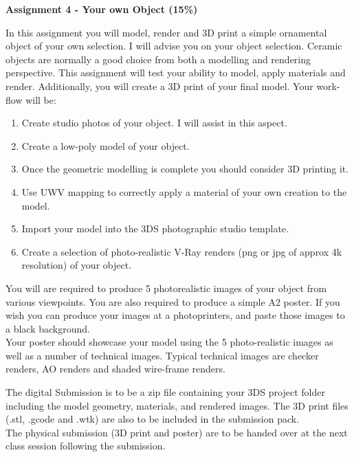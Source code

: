 

\begin{flushleft}
\Large\textbf{Assignment 4 - Your own Object (15\%)}\\
\end{flushleft}

In this assignment you will model, render and 3D print a simple ornamental object of your own selection.  I will advise you on your object selection.  Ceramic objects are normally a good choice from both a modelling and rendering perspective. This assignment will test your ability to model, apply materials and render.  Additionally, you will create a 3D print of your final model.  Your work-flow will be:
\begin{enumerate}
	\item Create studio photos of your object. I will assist in this aspect.
	\item Create a low-poly model of your object.
	\item Once the geometric modelling is complete you should consider 3D printing it.
	\item Use UWV mapping to correctly apply a material of your own creation to the model.
	\item Import your model into the 3DS photographic studio template.
	\item Create a selection of photo-realistic V-Ray renders (png or jpg of approx 4k resolution) of your object.
\end{enumerate}

You will are required to produce 5 photorealistic images of your object from various viewpoints.  You are also required to produce a simple A2 poster.  If you wish you can produce your images at a photoprinters, and paste those images to a black background.\\

Your poster should showcase your model using the 5 photo-realistic images as well as a number of technical images.  Typical technical images are checker renders, AO renders and shaded wire-frame renders. 

The digital Submission is to be a zip file containing your 3DS project folder including the model geometry, materials, and rendered images.  The 3D print files (.stl, .gcode and .wtk) are also to be included in the submission pack.  \\

The physical submission (3D print and poster) are to be handed over at the next class session following the submission.


\vspace{0.5cm}



